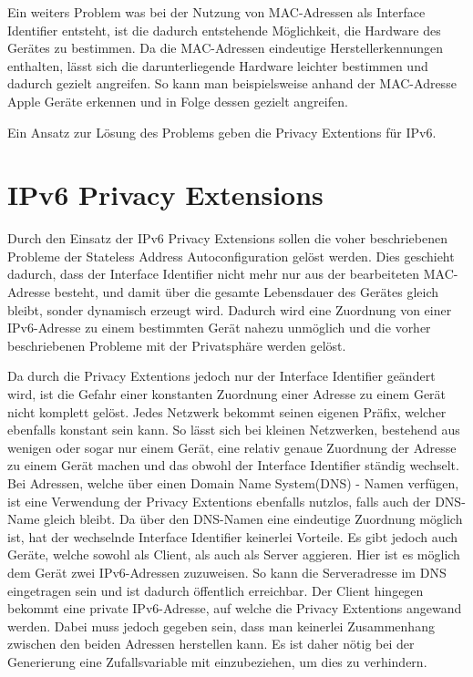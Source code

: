 \documentclass[a4paper, 12pt]{scrartcl}
\begin{document}
Ein weiters Problem was bei der Nutzung von MAC-Adressen als Interface Identifier entsteht, ist die dadurch entstehende Möglichkeit, die Hardware des Gerätes zu bestimmen. Da die MAC-Adressen eindeutige Herstellerkennungen enthalten, lässt sich die darunterliegende Hardware leichter bestimmen und dadurch gezielt angreifen. So kann man beispielsweise anhand der MAC-Adresse Apple Geräte erkennen und in Folge dessen gezielt angreifen.

Ein Ansatz zur Lösung des Problems geben die Privacy Extentions für IPv6.


\section{IPv6 Privacy Extensions}
Durch den Einsatz der IPv6 Privacy Extensions sollen die voher beschriebenen Probleme der Stateless Address Autoconfiguration gelöst werden.
Dies geschieht dadurch, dass der Interface Identifier nicht mehr nur aus der bearbeiteten MAC-Adresse besteht, und damit über die gesamte Lebensdauer des Gerätes gleich bleibt, sonder dynamisch erzeugt wird.
Dadurch wird eine Zuordnung von einer IPv6-Adresse zu einem bestimmten Gerät nahezu unmöglich und die vorher beschriebenen Probleme mit der Privatsphäre werden gelöst.


Da durch die Privacy Extentions jedoch nur der Interface Identifier geändert wird, ist die Gefahr einer konstanten Zuordnung einer Adresse zu einem Gerät nicht komplett gelöst.
Jedes Netzwerk bekommt seinen eigenen Präfix, welcher ebenfalls konstant sein kann. So lässt sich bei kleinen Netzwerken, bestehend aus wenigen oder sogar nur einem Gerät, eine relativ genaue Zuordnung der Adresse zu einem Gerät machen und das obwohl der Interface Identifier ständig wechselt.
Bei Adressen, welche über einen Domain Name System(DNS) - Namen verfügen, ist eine Verwendung der Privacy Extentions ebenfalls nutzlos, falls auch der DNS-Name gleich bleibt.
Da über den DNS-Namen eine eindeutige Zuordnung möglich ist, hat der wechselnde Interface Identifier keinerlei Vorteile.
Es gibt jedoch auch Geräte, welche sowohl als Client, als auch als Server aggieren. 
Hier ist es möglich dem Gerät zwei IPv6-Adressen zuzuweisen. So kann die Serveradresse im DNS eingetragen sein und ist dadurch öffentlich erreichbar. Der Client hingegen bekommt eine private IPv6-Adresse, auf welche die Privacy Extentions angewand werden. Dabei muss jedoch gegeben sein, dass man keinerlei Zusammenhang zwischen den beiden Adressen herstellen kann. Es ist daher nötig bei der Generierung eine Zufallsvariable mit einzubeziehen, um dies zu verhindern.
\end{document}
